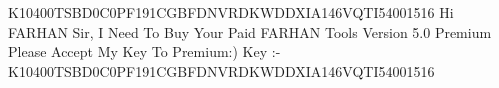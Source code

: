 K10400TSBD0C0PF191CGBFDNVRDKWDDXIA146VQTI54001516
Hi FARHAN Sir, I Need To Buy Your Paid FARHAN Tools Version 5.0 Premium Please Accept My Key To Premium:)
Key :- K10400TSBD0C0PF191CGBFDNVRDKWDDXIA146VQTI54001516
